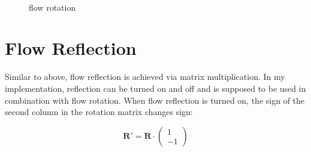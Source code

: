 \documentclass[a4paper,10pt,notitlepage]{scrreprt}
\newcommand{\mat}[1]{\mathbf{#1}}
\begin{document}
\begin{figure}
  \centering
  \\
  \caption{flow rotation}
  \label{fig:flow-rotation}
\end{figure}

\section{Flow Reflection}

Similar to above, flow reflection is achieved via matrix multiplication. In my
implementation, reflection can be turned on and off and is supposed to be used
in combination with flow rotation. When flow reflection is turned on, the sign
of the second column in the rotation matrix changes sign:

\begin{equation}
 \mat{R}' = \mat{R} \cdot \left( \begin{array}{c} 1 \\ -1\end{array} \right)
\end{equation}
\end{document}

